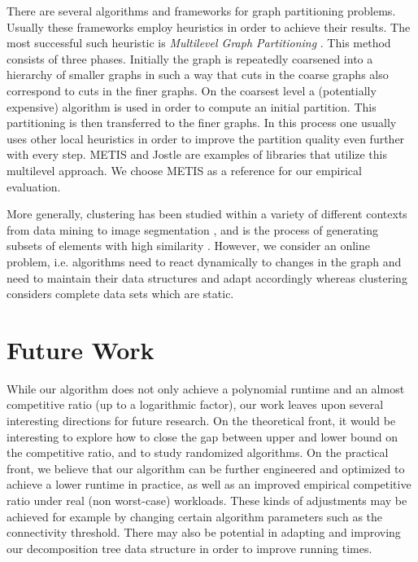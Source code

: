 \documentclass[a4paper,UKenglish,cleveref, autoref, thm-restate,authorcolumns]{../lipics/lipics-v2019}
\begin{document}
There are several algorithms and frameworks for graph partitioning problems. Usually these frameworks employ heuristics in order to achieve their results. The most successful such heuristic is \textit{Multilevel Graph Partitioning} \cite{Buluc2016}. This method consists of three phases. Initially the graph is repeatedly coarsened into a hierarchy of smaller graphs in such a way that cuts in the coarse graphs also correspond to cuts in the finer graphs. On the coarsest level a (potentially expensive) algorithm is used in order to compute an initial partition. This partitioning is then transferred to the finer graphs. In this process one usually uses other local heuristics in order to improve the partition quality even further with every step.
METIS \cite{Karypis1998, Karypis1998a} and Jostle \cite{Walshaw2000, walshaw2007jostle} are examples of libraries that utilize this multilevel approach. We choose METIS as a reference for our empirical evaluation.

More generally, clustering has been studied within a variety of
different contexts 
from data mining to image segmentation \cite{Benabdellah2019, Wu1993, Pavana},
and is the process of generating subsets of elements with high similarity 
\cite{Hartuv2000}. 
However, we consider an online problem, i.e. algorithms need to react dynamically to changes in the graph and need to maintain their data structures and adapt accordingly whereas clustering considers complete data sets which are static.

\section{Future Work}
	\label{sec:future_work}
	
While our algorithm does not only achieve a polynomial runtime
and an almost competitive ratio (up to a logarithmic factor),
our work leaves upon several interesting directions for future
research. 
On the theoretical front, it would be interesting to explore
how to close the gap between upper and lower bound
on the competitive ratio, and to study randomized algorithms.
On the practical front, we believe that our algorithm can
be further engineered and optimized to achieve a lower runtime
in practice, as well as an improved empirical competitive ratio
under real (non worst-case) workloads.
These kinds of adjustments may be achieved for example by changing certain algorithm parameters such as the connectivity threshold.
There may also be potential in adapting and improving our decomposition tree data structure in order to improve running times.
\end{document}
